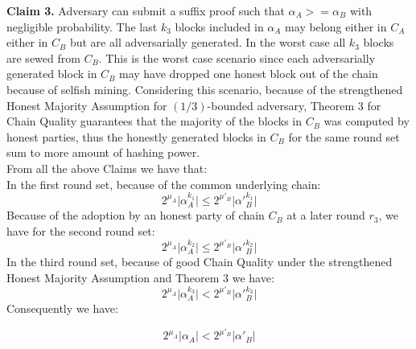 \textbf{Claim 3.} Adversary can submit a suffix proof such that $\alpha_A >= \alpha_B$
with negligible probability.
The last $k_3$ blocks included in $\alpha_A$ may belong either in $C_A$ either in
$C_B$ but are all adversarially generated. In the worst case  all $k_3 $ blocks
are sewed from $C_B$. This is the worst case scenario since each adversarially
generated block in $C_B$ may have dropped one honest block out of the chain
because of selfish mining. Considering this scenario, because of the strengthened
Honest Majority Assumption for $(1/3)$-bounded adversary, Theorem 3 for Chain
Quality guarantees that the majority of the blocks in $C_B$ was computed by
honest parties, thus the honestly generated blocks in $C_B$ for the same round
set sum to more amount of hashing power.\\
From all the above Claims we have that:\\
In the first round set, because of the common underlying chain:
\begin{equation} \label{eq_v_round_set_1}
2^{\mu_A} \vert \alpha_A^{k_1} \vert \leq 2^{\mu'_B} \vert \alpha'{_B^{k_1}} \vert
\end{equation}
Because of the adoption by an honest party of chain $C_B$ at a later round $r_3$, we
have for the second round set:
\begin{equation} \label{eq_v_round_set_2}
2^{\mu_A} \vert \alpha_A^{k_2} \vert \leq 2^{\mu'_B} \vert \alpha'{_B^{k_2}} \vert
\end{equation}
In the third round set, because of good Chain Quality under the strengthened Honest
Majority Assumption and Theorem 3 we have:
\begin{equation} \label{eq_v_round_set_3}
2^{\mu_A} \vert \alpha_A^{k_3} \vert < 2^{\mu'_B} \vert \alpha'{_B^{k_3}} \vert
\end{equation}
Consequently we have:

\begin{equation} \label{eq_v_all_round_sets}
2^{\mu_A} \vert \alpha_A \vert < 2^{\mu'_B} \vert \alpha'{_B} \vert
\end{equation}
